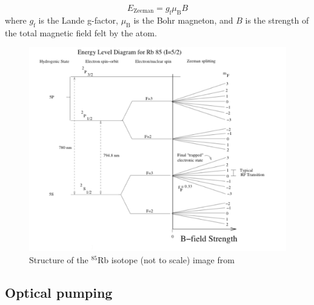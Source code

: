 \begin{equation}
E_{\mathrm{Zeeman}}= g_{\mathrm{f}} \mu_{\mathrm{B}} B
\label{zeeman}
\end{equation}
where $g_{\mathrm{f}}$ is the Lande g-factor, $\mu_{\mathrm{B}}$ is the Bohr magneton, and $B$ is the strength of the total magnetic field felt by the atom.
\begin{figure}[H]
  \includegraphics[totalheight=0.65\textwidth]{figs/energy_levels}
  \caption{Structure of the $^{85}$Rb isotope (not to scale) image from \cite{manual}}
  \label{energy_levels}
\end{figure}

\subsection{Optical pumping}

